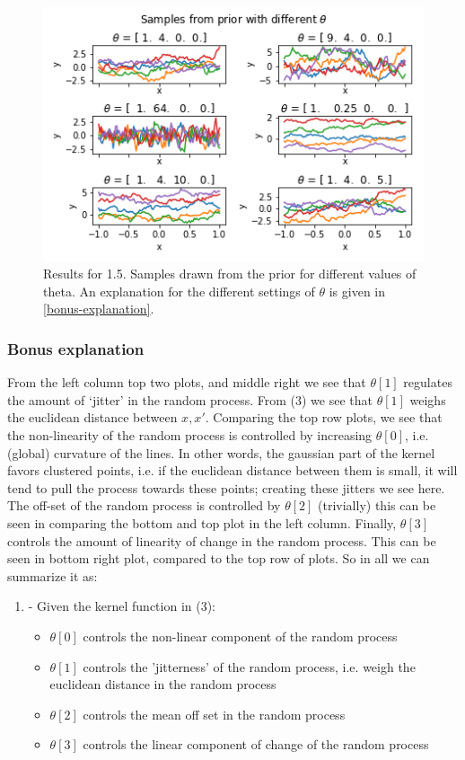\documentclass[11pt]{article}
\makeatletter
\def\maxwidth{\ifdim\Gin@nat@width>\linewidth\linewidth
    \else\Gin@nat@width\fi}
\let\Oldincludegraphics\includegraphics
\renewcommand{\includegraphics}[1]{\Oldincludegraphics[width=.8\maxwidth]{#1}}
\makeatother
\begin{document}
	\begin{figure}[H]
	\includegraphics{../Figures/1.5.png}
	\caption{Results for 1.5. Samples drawn from the prior for different values of theta. An explanation for the different settings of $\theta$ is given in \ref{bonus-explanation}.}
	\end{figure}

    \subsubsection*{Bonus explanation}\label{bonus-explanation} 

From the left column top two plots, and middle right we see that
\(\theta[1]\) regulates the amount of `jitter' in the random process.
From (3) we see that \(\theta[1]\) weighs the euclidean distance between
\(x, x'\). Comparing the top row plots, we see that the non-linearity of
the random process is controlled by increasing \(\theta[0]\), i.e.
(global) curvature of the lines. In other words, the gaussian part of the kernel favors clustered points, i.e. if the euclidean distance between them is small, it will tend to pull the process towards these points; creating these jitters we see here.  The off-set of the random process is
controlled by \(\theta[2]\) (trivially) this can be seen in comparing
the bottom and top plot in the left column. Finally, \(\theta[3]\)
controls the amount of linearity of change in the random process. This
can be seen in bottom right plot, compared to the top row of plots. So
in all we can summarize it as:

\begin{enumerate}
  \item - Given the kernel function in (3):
  \begin{itemize}
  \item  $\theta[0]$ controls the non-linear component of the random process

  \item  $\theta[1]$ controls the 'jitterness' of the random process, i.e. weigh the euclidean distance in the random process

  \item $\theta[2]$ controls the mean off set in the random process

  \item $\theta[3]$ controls the linear component of change of the random process
  \end{itemize}
\end{enumerate}
\end{document}
